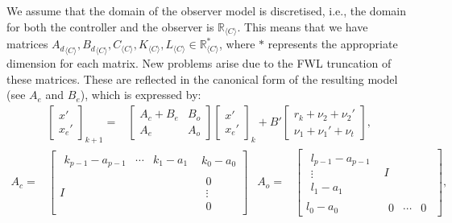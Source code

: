 \documentclass[sigconf]{llncs}
\newcommand{\mat}[1]{{#1}}
\renewcommand{\vec}[1]{{#1}}
\begin{document}
We assume that the domain of the observer model is discretised, 
i.e., the domain for both the controller and the observer is $\mathbb{R}_{\langle C \rangle}$.
This means that we have matrices 
${\mat{A}_d}_{\langle C
\rangle},{\mat{B}_d}_{\langle C \rangle},\mat{C}_{\langle C \rangle},
\mat{K}_{\langle C \rangle}, \mat{L}_{\langle C \rangle} \in
\mathbb{R}_{\langle C \rangle}^*$, 
where $*$ represents the appropriate dimension for each matrix.
New problems arise due to the FWL truncation of these matrices. 
These are reflected in the canonical form of the resulting model (see $\mat{A}_e$ and $\mat{B}_e$),
which is expressed by:
%
{\setlength{\belowdisplayskip}{2pt}
\begin{align}
\left [\begin{array}{c}\vec{x}'\\ \vec{x}_e' \end{array}\right]_{k+1}
=& \left [\begin{array}{cc}\mat{A}_{c}+\mat{B}_{e}&\mat{B}_{o}\\ \mat{A}_{e}&\mat{A}_{o}\end{array}\right]
\left [\begin{array}{c}\vec{x}'\\ \vec{x}_e' \end{array}\right]_k
+\mat{B}'\left [\begin{array}{c} \vec{r}_k + \nu_2+\nu_2'\\ \nu_1+\nu_1'+\nu_t\end{array}\right], %
\label{eq:observer_LTI_FWL_cf}
\end{align}
}
{\setlength{\abovedisplayskip}{2pt}
\setlength{\belowdisplayskip}{2pt}
\begin{align*}
\mat{A}_c=&\left[\begin{array}{cc}
\begin{array}{ccc}k_{p-1}-a_{p-1}&\cdots&k_1-a_1\end{array}&k_0-a_0\\
\mat{I}&\begin{array}{c}0\\ \vdots \\ 0\end{array}
\end{array}\right]&
\mat{A}_o=&\left[\begin{array}{cc}
\begin{array}{c}l_{p-1}-a_{p-1}\\ \vdots\\ l_1-a_1\end{array}&\mat{I}\\
l_0-a_0&\begin{array}{ccc}0&\cdots&0\end{array}
\end{array}\right], 
\end{align*}
}
\end{document}
